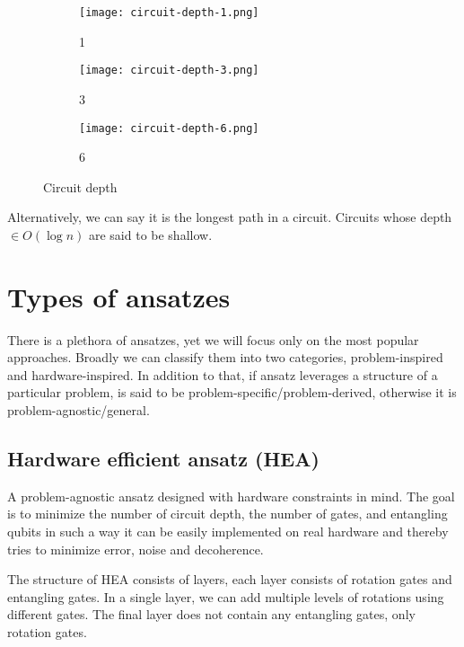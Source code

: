 \begin{figure}[H]
    \centering
    \begin{subfigure}[b]{0.2\textwidth}
        \centering
        \texttt{[image: circuit-depth-1.png]} 
        \caption*{1}
    \end{subfigure}
    \hfill
    \begin{subfigure}[b]{0.3\textwidth}
        \centering
        \texttt{[image: circuit-depth-3.png]}
        \caption*{3}
    \end{subfigure}
    \hfill
    \begin{subfigure}[b]{0.45\textwidth}
        \centering
        \texttt{[image: circuit-depth-6.png]}
        \caption*{6}
    \end{subfigure}
       \caption{Circuit depth}
       \label{fig:circuit-depth}
\end{figure}

Alternatively, we can say it is the longest path in a circuit. Circuits whose depth $\in O(\log n)$ are said to be shallow.~\cite{holmes2022}

\section{Types of ansatzes}
There is a plethora of ansatzes, yet we will focus only on the most popular approaches. Broadly we can classify them into two categories, problem-inspired and hardware-inspired. In addition to that, if ansatz leverages a structure of a particular problem, is said to be problem-specific/problem-derived, otherwise it is problem-agnostic/general. 

\subsection{Hardware efficient ansatz (HEA)}
A problem-agnostic ansatz designed with hardware constraints in mind. The goal is to minimize the number of circuit depth, the number of gates, and entangling qubits in such a way it can be easily implemented on real hardware and thereby tries to minimize error, noise and decoherence.

The structure of HEA consists of layers, each layer consists of rotation gates and entangling gates. In a single layer, we can add multiple levels of rotations using different gates. The final layer does not contain any entangling gates, only rotation gates.

\\
\\
\\

